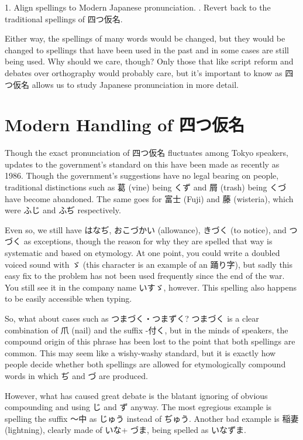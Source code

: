 \par{1. Align spellings to Modern Japanese pronunciation. \hfill{}. Revert back to the traditional spellings of 四つ仮名. }

\par{ Either way, the spellings of many words would be changed, but they would be changed to spellings that have been used in the past and in some cases are still being used. Why should we care, though? Only those that like script reform and debates over orthography would probably care, but it's important to know as 四つ仮名 allows us to study Japanese pronunciation in more detail. }
      
\section{Modern Handling of 四つ仮名}
 
\par{ Though the exact pronunciation of 四つ仮名 fluctuates among Tokyo speakers, updates to the government's standard on this have been made as recently as 1986. Though the government's suggestions have no legal bearing on people, traditional distinctions such as 葛 (vine) being くず and 屑 (trash) being くづ have become abandoned. The same goes for 富士 (Fuji) and 藤 (wisteria), which were ふじ and ふぢ respectively. }

\par{ Even so, we still have はなぢ, おこづかい (allowance), きづく (to notice), and つづく as exceptions, though the reason for why they are spelled that way is systematic and based on etymology. At one point, you could write a doubled voiced sound with ゞ (this character is an example of an 踊り字), but sadly this easy fix to the problem has not been used frequently since the end of the war. You still see it in the company name いすゞ, however. This spelling also happens to be easily accessible when typing. }

\par{ So, what about cases such as つまづく・つまずく? つまづく is a clear combination of 爪 (nail) and the suffix -付く, but in the minds of speakers, the compound origin of this phrase has been lost to the point that both spellings are common. This may seem like a wishy-washy standard, but it is exactly how people decide whether both spellings are allowed for etymologically compound words in which ぢ and づ are produced. }

\par{ However, what has caused great debate is the blatant ignoring of obvious compounding and using じ and ず anyway. The most egregious example is spelling the suffix ～中 as じゅう instead of ぢゅう. Another bad example is 稲妻 (lightning), clearly made of いな+ づま, being spelled as いなずま. }

